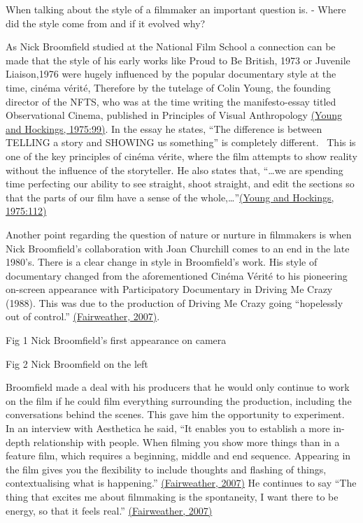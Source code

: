 \documentclass[
]{book}
\begin{document}
When talking about the style of a filmmaker an important question is. - Where did the style come from and if it evolved why?

As Nick Broomfield studied at the National Film School a connection can be made that the style of his early works like Proud to Be British, 1973 or Juvenile Liaison,1976 were hugely influenced by the popular documentary style at the time, cinéma vérité, Therefore by the tutelage of Colin Young, the founding director of the NFTS, who was at the time writing the manifesto-essay titled Observational Cinema, published in Principles of Visual Anthropology \href{https://paperpile.com/c/SdLVV0/uTip/?locator=99}{(Young and Hockings, 1975:99)}. In the essay he states, ``The difference is between TELLING a story and SHOWING us something'' is completely different.~ This is one of the key principles of cinéma vérite, where the film attempts to show reality without the influence of the storyteller. He also states that, ``\ldots we are spending time perfecting our ability to see straight, shoot straight, and edit the sections so that the parts of our film have a sense of the whole,\ldots{}''\href{https://paperpile.com/c/SdLVV0/uTip/?locator=112}{(Young and Hockings, 1975:112)}

Another point regarding the question of nature or nurture in filmmakers is when Nick Broomfield's collaboration with Joan Churchill comes to an end in the late 1980's. There is a clear change in style in Broomfield's work. His style of documentary changed from the aforementioned Cinéma Vérité to his pioneering on-screen appearance with Participatory Documentary in Driving Me Crazy (1988). This was due to the production of Driving Me Crazy going ``hopelessly out of control.'' \href{https://paperpile.com/c/SdLVV0/XGco}{(Fairweather, 2007)}.~

Fig 1 Nick Broomfield's first appearance on camera

Fig 2 Nick Broomfield on the left

Broomfield made a deal with his producers that he would only continue to work on the film if he could film everything surrounding the production, including the conversations behind the scenes. This gave him the opportunity to experiment.~ In an interview with Aesthetica he said, ``It enables you to establish a more in-depth relationship with people. When filming you show more things than in a feature film, which requires a beginning, middle and end sequence. Appearing in the film gives you the flexibility to include thoughts and flashing of things, contextualising what is happening.'' \href{https://paperpile.com/c/SdLVV0/XGco}{(Fairweather, 2007)} He continues to say ``The thing that excites me about filmmaking is the spontaneity, I want there to be energy, so that it feels real.'' \href{https://paperpile.com/c/SdLVV0/XGco}{(Fairweather, 2007)}
\end{document}

